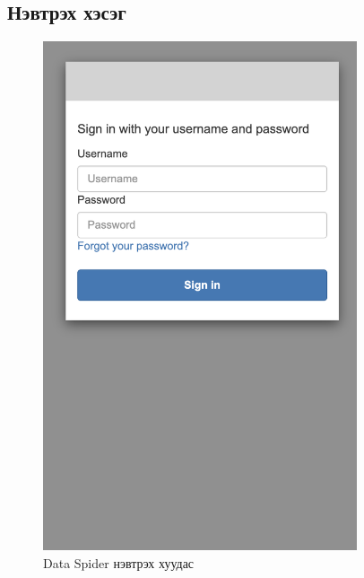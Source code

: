 \subsection{Нэвтрэх хэсэг}
\begin{figure}
	\centering
	\includegraphics[height=15cm]{images/dataspider-login.png}
	\caption{Data Spider нэвтрэх хуудас}
	\label{fig:toast}
\end{figure}
\pagebreak
